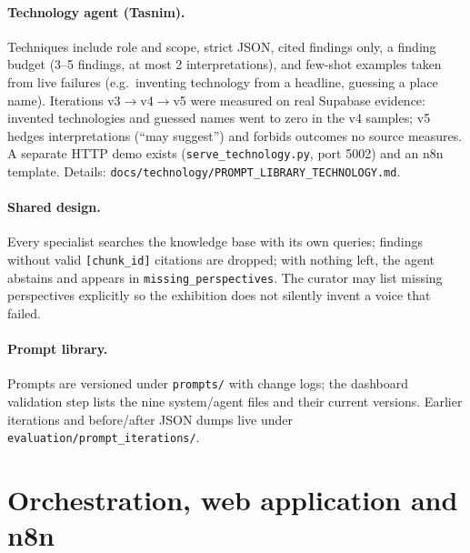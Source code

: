 \documentclass[11pt,a4paper]{article}
\begin{document}
\paragraph{Technology agent (Tasnim).}
Techniques include role and scope, strict JSON, cited findings only, a finding budget (3--5 findings, at most 2 interpretations), and few-shot examples taken from live failures (e.g.\ inventing technology from a headline, guessing a place name). Iterations v3$\rightarrow$v4$\rightarrow$v5 were measured on real Supabase evidence: invented technologies and guessed names went to zero in the v4 samples; v5 hedges interpretations (``may suggest'') and forbids outcomes no source measures. A separate HTTP demo exists (\texttt{serve\_technology.py}, port 5002) and an n8n template. Details: \texttt{docs/technology/PROMPT\_LIBRARY\_TECHNOLOGY.md}.

\paragraph{Shared design.}
Every specialist searches the knowledge base with its own queries; findings without valid \texttt{[chunk\_id]} citations are dropped; with nothing left, the agent abstains and appears in \texttt{missing\_perspectives}. The curator may list missing perspectives explicitly so the exhibition does not silently invent a voice that failed.

\paragraph{Prompt library.}
Prompts are versioned under \texttt{prompts/} with change logs; the dashboard validation step lists the nine system/agent files and their current versions. Earlier iterations and before/after JSON dumps live under \texttt{evaluation/prompt\_iterations/}.

\section{Orchestration, web application and n8n}
\end{document}
